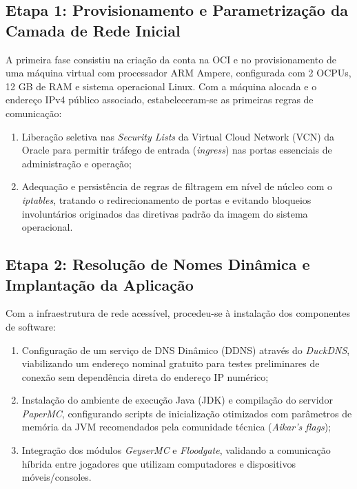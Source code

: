 \subsection{Etapa 1: Provisionamento e Parametrização da Camada de Rede Inicial}
A primeira fase consistiu na criação da conta na OCI e no provisionamento de uma máquina virtual com processador ARM Ampere, configurada com 2 OCPUs, 12 GB de RAM e sistema operacional Linux. Com a máquina alocada e o endereço IPv4 público associado, estabeleceram-se as primeiras regras de comunicação:
\begin{enumerate}
    \item Liberação seletiva nas \textit{Security Lists} da Virtual Cloud Network (VCN) da Oracle para permitir tráfego de entrada (\textit{ingress}) nas portas essenciais de administração e operação;
    \item Adequação e persistência de regras de filtragem em nível de núcleo com o \textit{iptables}, tratando o redirecionamento de portas e evitando bloqueios involuntários originados das diretivas padrão da imagem do sistema operacional.
\end{enumerate}

\subsection{Etapa 2: Resolução de Nomes Dinâmica e Implantação da Aplicação}
Com a infraestrutura de rede acessível, procedeu-se à instalação dos componentes de software:
\begin{enumerate}
    \item Configuração de um serviço de DNS Dinâmico (DDNS) através do \textit{DuckDNS}, viabilizando um endereço nominal gratuito para testes preliminares de conexão sem dependência direta do endereço IP numérico;
    \item Instalação do ambiente de execução Java (JDK) e compilação do servidor \textit{PaperMC}, configurando scripts de inicialização otimizados com parâmetros de memória da JVM recomendados pela comunidade técnica (\textit{Aikar's flags});
    \item Integração dos módulos \textit{GeyserMC} e \textit{Floodgate}, validando a comunicação híbrida entre jogadores que utilizam computadores e dispositivos móveis/consoles.
\end{enumerate}


